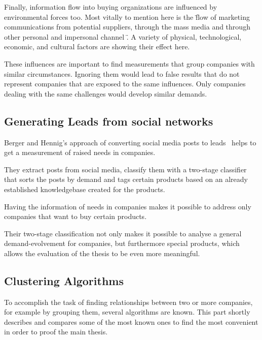 Finally, information flow into buying organizations are influenced by environmental forces too. Most vitally
to mention here is the \"flow of marketing communications from potential suppliers, through the mass media and
through other personal and impersonal channel \". A variety of physical, technological, economic, and cultural
factors are showing their effect here.

These influences are important to find measurements that group companies with similar circumstances. Ignoring
them would lead to false results that do not represent companies that are exposed to the same influences. Only companies
dealing with the same challenges would develop similar demands.

\subsection{Generating Leads from social networks}
Berger and Hennig's approach of converting social media posts to leads~\cite{n2o} helps to get a measurement of
raised needs in companies.

They extract posts from social media, classify them with a two-stage classifier that sorts the posts by demand and
tags certain products based on an already established knowledgebase created for the products.

Having the information of needs in companies makes it possible to address only companies that want to buy certain
products.

Their two-stage classification not only makes it possible to analyse a general demand-evolvement for companies,
but furthermore special products, which allows the evaluation of the thesis to be even more meaningful.

\subsection{Clustering Algorithms}
To accomplish the task of finding relationships between two or more companies, for example by grouping them, several
algorithms are known. This part shortly describes and compares some of the most known ones to find the most convenient
in order to proof the main thesis.

